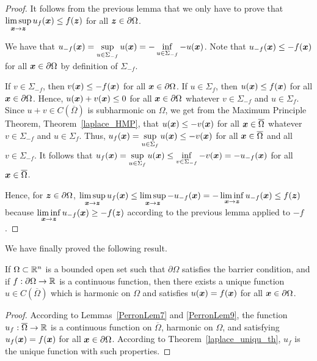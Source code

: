 \begin{proof}
It follows from the previous lemma that we only have to prove that
$\displaystyle \limsup_{{\bm{x}}\to {\bm{z}}} u_f({\bm{x}}) \leq f({\bm{z}})$
for all ${\bm{z}} \in \partial \Omega$.

We have that
$\displaystyle u_{-f}({\bm{x}}) = \sup_{u \in \Sigma_{-f}} u({\bm{x}})
= -\inf_{u \in \Sigma_{-f}} -u({\bm{x}})$.
Note that $u_{-f}({\bm{x}}) \leq -f({\bm{x}})$ for all
${\bm{x}} \in \partial \Omega$ by definition of $\Sigma_{-f}$.

If $v \in \Sigma_{-f}$, then $v({\bm{x}}) \leq -f({\bm{x}})$ for all
${\bm{x}} \in \partial \Omega$.
If $u \in \Sigma_f$, then $u({\bm{x}}) \leq f({\bm{x}})$ for all
${\bm{x}} \in \partial \Omega$.  Hence, $u({\bm{x}}) + v({\bm{x}}) \leq 0$
for all ${\bm{x}} \in \partial \Omega$ whatever
$v \in \Sigma_{-f}$ and $u \in \Sigma_f$.  Since
$\displaystyle u+v \in C(\overline{\Omega})$ is subharmonic
on $\Omega$, we get from the Maximum Principle Theorem,
Theorem~\ref{laplace_HMP}, that
$u({\bm{x}}) \leq -v({\bm{x}})$ for all ${\bm{x}} \in \overline{\Omega}$
whatever $v \in \Sigma_{-f}$ and $u \in \Sigma_f$.
Thus,
$\displaystyle u_f({\bm{x}}) = \sup_{u \in \Sigma_f} u({\bm{x}}) \leq -v({\bm{x}})$
for all ${\bm{x}} \in \overline{\Omega}$ and all $v \in \Sigma_{-f}$.
It follows that
$\displaystyle u_f({\bm{x}}) = \sup_{u \in \Sigma_f} u({\bm{x}})
\leq \inf_{v \in \Sigma_{-f}} -v({\bm{x}}) = -u_{-f}({\bm{x}})$
for all ${\bm{x}} \in \overline{\Omega}$.

Hence, for ${\bm{z}} \in \partial \Omega$,
$\displaystyle \limsup_{{\bm{x}} \to {\bm{z}}} u_f({\bm{x}})
\leq \limsup_{{\bm{x}} \to {\bm{z}}} -u_{-f}({\bm{x}})
= -\liminf_{{\bm{x}} \to {\bm{z}}} u_{-f}({\bm{x}})
\leq f({\bm{z}})$
because $\displaystyle \liminf_{{\bm{x}} \to {\bm{z}}} u_{-f}({\bm{x}})
\geq -f({\bm{z}})$ according to the previous lemma applied to $-f$.
\end{proof}

We have finally proved the following result.

\begin{theorem} \label{PerronExistTh}
If $\Omega \subset \mathbb{R}^n$ is a bounded open set such that
$\partial \Omega$ satisfies the barrier condition, and if
$f:\partial \Omega \to \mathbb{R}$ is a continuous function, then there
exists a unique function
$\displaystyle u \in C(\overline{\Omega})$ which is
harmonic on $\Omega$ and satisfies $u({\bm{x}}) = f({\bm{x}})$ for all
${\bm{x}} \in \partial \Omega$.
\end{theorem}

\begin{proof}
According to Lemmas~\ref{PerronLem7} and \ref{PerronLem9}, the function
$u_f: \overline{\Omega} \to \mathbb{R}$ is a continuous function on
$\overline{\Omega}$, harmonic on $\Omega$, and satisfying
$u_f({\bm{x}}) = f({\bm{x}})$ for all
${\bm{x}} \in \partial \Omega$.  According to
Theorem~\ref{laplace_uniqu_th}, $u_f$ is the unique function with such
properties.
\end{proof}


